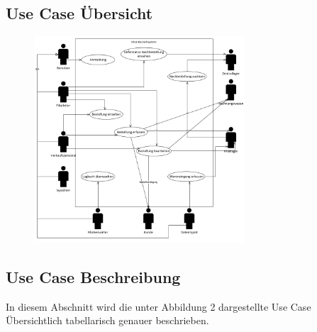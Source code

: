 \subsection{Use Case Übersicht}

\begin{figure}[H]%
\centering
\includegraphics[width=0.7\textwidth]{Images/usecase-u.png}
\label{fig:usecase}
\end{figure}


\subsection{Use Case Beschreibung}
In diesem Abschnitt wird die unter Abbildung 2 dargestellte Use Case Übersichtlich tabellarisch genauer beschrieben.











